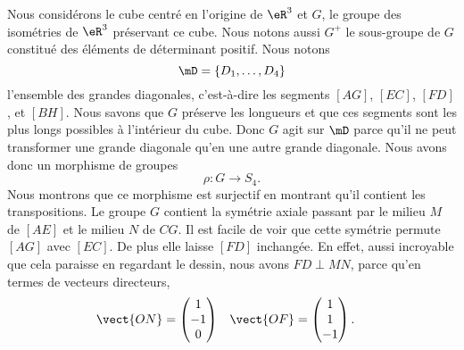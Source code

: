 \begin{wrapfigure}{r}{6.0cm}
	\vspace{-0.5cm}        %
	\centering
	
\end{wrapfigure}
Nous considérons le cube centré en l'origine de \( \eR^3\) et \( G\), le groupe des isométries de \( \eR^3\) préservant ce cube. Nous notons aussi \( G^+\) le sous-groupe de \( G\) constitué des éléments de déterminant positif. Nous notons
\begin{equation}
	\mD=\{ D_1,\ldots, D_4 \}
\end{equation}
l'ensemble des grandes diagonales, c'est-à-dire les segments \( [AG]\), \( [EC]\), \( [FD]\), et \( [BH]\). Nous savons que \( G\) préserve les longueurs et que ces segments sont les plus longs possibles à l'intérieur du cube. Donc \( G\) agit sur \( \mD\) parce qu'il ne peut transformer une grande diagonale qu'en une autre grande diagonale. Nous avons donc un morphisme de groupes
\begin{equation}
	\rho\colon G\to S_4.
\end{equation}
Nous montrons que ce morphisme est surjectif en montrant qu'il contient les transpositions. Le groupe \( G\) contient la symétrie axiale passant par le milieu \( M\) de \( [AE]\) et le milieu \( N\) de \( CG\). Il est facile de voir que cette symétrie permute \( [AG]\) avec \( [EC]\). De plus elle laisse \( [FD]\) inchangée. En effet, aussi incroyable que cela paraisse en regardant le dessin, nous avons \( FD\perp MN\), parce qu'en termes de vecteurs directeurs,
\begin{equation}
	\begin{aligned}[]
		\vect{ ON } & =\begin{pmatrix}
			1  \\
			-1 \\
			0
		\end{pmatrix} & \vect{ OF } & =\begin{pmatrix}
			1 \\
			1 \\
			-1
		\end{pmatrix}.
	\end{aligned}
\end{equation}

